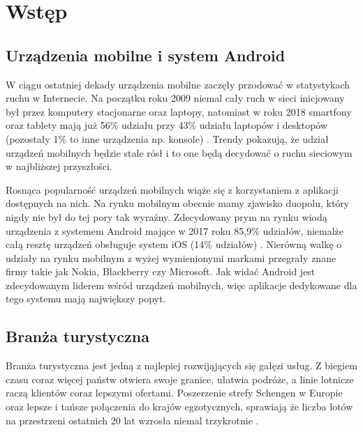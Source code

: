 \documentclass[a4paper,12pt]{article}
\begin{document}



\setcounter{tocdepth}{4}
\setcounter{secnumdepth}{4}

\tableofcontents
\newpage

\setcounter{page}{2}
\section{Wstęp}
\subsection{Urządzenia mobilne i system Android}

W ciągu ostatniej dekady urządzenia mobilne zaczęły przodować w statystykach ruchu w Internecie. Na początku roku 2009 niemal cały ruch w sieci inicjowany był przez komputery stacjonarne oraz laptopy, natomiast w roku 2018 smartfony oraz tablety mają już 56\% udziału przy 43\% udziału laptopów i desktopów (pozostały 1\% to inne urządzenia np. konsole) \cite{wasuk}. Trendy pokazują, że udział urządzeń mobilnych będzie stale rósł i to one będą decydować o ruchu sieciowym w najbliższej przyszłości.

Rosnąca popularność urządzeń mobilnych wiąże się z korzystaniem z aplikacji dostępnych na nich. Na rynku mobilnym obecnie mamy zjawisko duopolu, który nigdy nie był do tej pory tak wyraźny. Zdecydowany prym na rynku wiodą urządzenia z systemem Android mające w 2017 roku 85,9\% udziałów, niemalże całą resztę urządzeń obsługuje system iOS (14\% udziałów) \cite{spidersweb}. Nierówną walkę o udziały na rynku mobilnym z wyżej wymienionymi markami przegrały znane firmy takie jak Nokia, Blackberry czy Microsoft. Jak widać Android jest zdecydowanym liderem wśród urządzeń mobilnych, więc aplikacje dedykowane dla tego systemu mają największy popyt.

\subsection{Branża turystyczna}

Branża turystyczna jest jedną z najlepiej rozwijąjących się gałęzi usług. Z biegiem czasu coraz więcej państw otwiera swoje granice, ułatwia podróże, a linie lotnicze raczą klientów coraz lepszymi ofertami. Poszerzenie strefy Schengen w Europie oraz lepsze i tańsze połączenia do krajów egzotycznych, sprawiają że liczba lotów na przestrzeni ostatnich 20 lat wzrosła niemal trzykrotnie \cite{databank}. 
\end{document}
